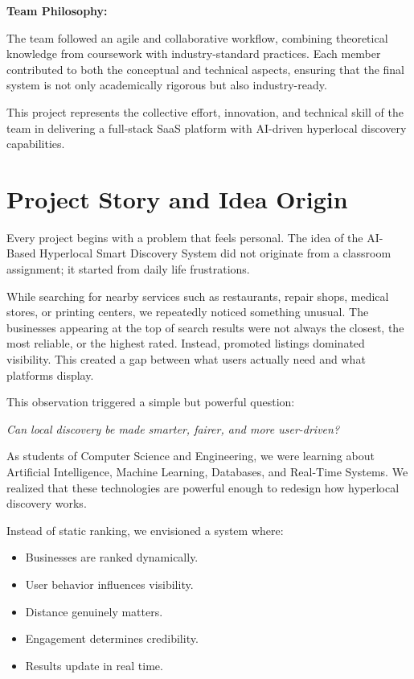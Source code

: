 \documentclass[12pt,a4paper]{report}
\begin{document}
\textbf{Team Philosophy:} 

The team followed an agile and collaborative workflow, combining theoretical knowledge from coursework with industry-standard practices. Each member contributed to both the conceptual and technical aspects, ensuring that the final system is not only academically rigorous but also industry-ready. 

This project represents the collective effort, innovation, and technical skill of the team in delivering a full-stack SaaS platform with AI-driven hyperlocal discovery capabilities.


\chapter{Project Story and Idea Origin}

Every project begins with a problem that feels personal. The idea of the AI-Based Hyperlocal Smart Discovery System did not originate from a classroom assignment; it started from daily life frustrations.

While searching for nearby services such as restaurants, repair shops, medical stores, or printing centers, we repeatedly noticed something unusual. The businesses appearing at the top of search results were not always the closest, the most reliable, or the highest rated. Instead, promoted listings dominated visibility. This created a gap between what users actually need and what platforms display.

This observation triggered a simple but powerful question:

\textit{Can local discovery be made smarter, fairer, and more user-driven?}

As students of Computer Science and Engineering, we were learning about Artificial Intelligence, Machine Learning, Databases, and Real-Time Systems. We realized that these technologies are powerful enough to redesign how hyperlocal discovery works.

Instead of static ranking, we envisioned a system where:

\begin{itemize}

\item Businesses are ranked dynamically.

\item User behavior influences visibility.

\item Distance genuinely matters.

\item Engagement determines credibility.

\item Results update in real time.

\end{itemize}
\end{document}
